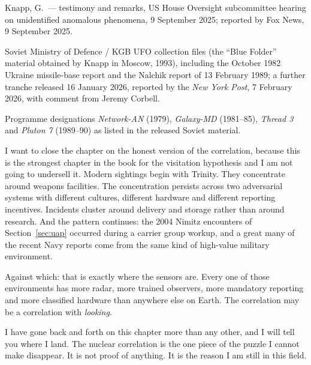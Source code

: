 \begin{srcnotes}
\item Knapp, G.\ --- testimony and remarks, US House Oversight subcommittee hearing on unidentified
anomalous phenomena, 9 September 2025; reported by Fox News, 9 September 2025.
\item Soviet Ministry of Defence / KGB UFO collection files (the ``Blue Folder'' material obtained
by Knapp in Moscow, 1993), including the October 1982 Ukraine missile-base report and the Nalchik
report of 13 February 1989; a further tranche released 16 January 2026, reported by the
\emph{New York Post}, 7 February 2026, with comment from Jeremy Corbell.
\item Programme designations \emph{Network-AN} (1979), \emph{Galaxy-MD} (1981--85), \emph{Thread
3} and \emph{Pluton 7} (1989--90) as listed in the released Soviet material.
\end{srcnotes}

I want to close the chapter on the honest version of the correlation, because this is the strongest
chapter in the book for the visitation hypothesis and I am not going to undersell it. Modern
sightings begin with Trinity. They concentrate around weapons facilities. The concentration
persists across two adversarial systems with different cultures, different hardware and different
reporting incentives. Incidents cluster around delivery and storage rather than around research.
And the pattern continues: the 2004 Nimitz encounters of Section~\ref{sec:uap} occurred during a carrier
group workup, and a great many of the recent Navy reports come from the same kind of high-value
military environment.

Against which: that is exactly where the sensors are. Every one of those environments has more
radar, more trained observers, more mandatory reporting and more classified hardware than anywhere
else on Earth. The correlation may be a correlation with \emph{looking}.

I have gone back and forth on this chapter more than any other, and I will tell you where I land.
The nuclear correlation is the one piece of the puzzle I cannot make disappear. It is not proof of
anything. It is the reason I am still in this field.
